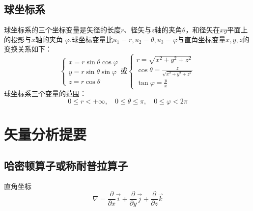 \documentclass[12pt, UTF8, AutoFakeBold]{ctexart} %
\begin{document}
\subsection{球坐标系}
球坐标系的三个坐标变量是矢径的长度$r$、径矢与$z$轴的夹角$\theta$，和径矢在$xy$平面上的投影与$x$轴的夹角
$\varphi$.球坐标变量比$u_1 = r,u_2 = \theta,u_3 = \varphi$与直角坐标变量$x,y,z$的变换关系如下：
\[
    \begin{cases}
        x = r \sin\theta \cos\varphi\\
        y = r \sin\theta \sin\varphi\\
        z = r \cos\theta
    \end{cases}
    \text{或}
    \begin{cases}
        r = \sqrt{x^2 + y^2 + z^2}\\
        \cos\theta = \frac{z}{\sqrt{x^2 + y^2 + z^2}}\\
        \tan\varphi = \frac{y}{x}
    \end{cases}
\]
球坐标系三个变量的范围：
\[
    0 \leq r < +\infty, \quad
    0 \leq \theta \leq \pi, \quad
    0 \leq \varphi < 2\pi
\]

\begin{figure}[htbp]
    \centering
    \qquad
    
\end{figure}


\section{矢量分析提要}

\subsection{哈密顿算子或称耐普拉算子}
直角坐标
\[
    \nabla = \frac{\partial}{\partial x}\vec{i}
    + \frac{\partial}{\partial y}\vec{j}
    + \frac{\partial}{\partial z}\vec{k}
\]
\end{document}
